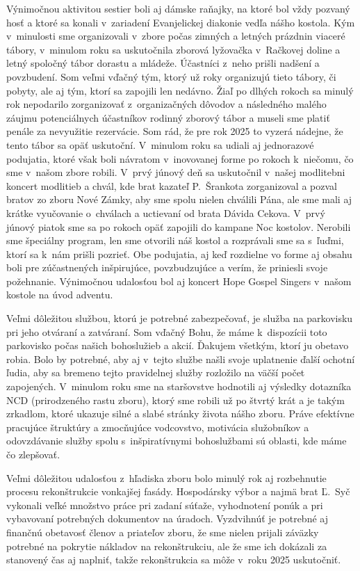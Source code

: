 Výnimočnou aktivitou sestier boli aj dámske raňajky, na ktoré bol vždy pozvaný hosť a ktoré sa konali v~zariadení Evanjelickej diakonie vedľa nášho kostola.
Kým v~minulosti sme organizovali v~zbore počas zimných a letných prázdnin viaceré tábory, v~minulom roku sa uskutočnila zborová lyžovačka v~Račkovej doline a letný spoločný tábor dorastu a mládeže. Účastníci z~neho prišli nadšení a povzbudení. Som veľmi vďačný tým, ktorý už roky organizujú tieto tábory, či pobyty, ale aj tým, ktorí sa zapojili len nedávno. Žiaľ po dlhých rokoch sa minulý rok nepodarilo zorganizovať z~organizačných dôvodov a následného malého záujmu potenciálnych účastníkov rodinný zborový tábor a museli sme platiť penále za nevyužitie rezervácie. Som rád, že pre rok 2025 to vyzerá nádejne, že tento tábor sa opäť uskutoční.
V~minulom roku sa udiali aj jednorazové podujatia, ktoré však boli návratom v~inovovanej forme po rokoch k~niečomu, čo sme v~našom zbore robili.
V~prvý júnový deň sa uskutočnil v~našej modlitebni koncert modlitieb a chvál, kde brat kazateľ P.~Šrankota zorganizoval a pozval bratov zo zboru Nové Zámky, aby sme spolu nielen chválili Pána, ale sme mali aj krátke vyučovanie o~chválach a uctievaní od brata Dávida Cekova. V~prvý júnový piatok sme sa po rokoch opäť zapojili do kampane Noc kostolov. Nerobili sme špeciálny program, len sme otvorili náš kostol a rozprávali sme sa s~ľuďmi, ktorí sa k~nám prišli pozrieť. Obe podujatia, aj keď rozdielne vo forme aj obsahu boli pre zúčastnených inšpirujúce, povzbudzujúce a verím, že priniesli svoje požehnanie. Výnimočnou udalosťou bol aj koncert Hope Gospel Singers v~našom kostole na úvod adventu.

Veľmi dôležitou službou, ktorú je potrebné zabezpečovať, je služba na parkovisku pri jeho otváraní a zatváraní. Som vďačný Bohu, že máme k~dispozícii toto parkovisko počas našich bohoslužieb a akcií. Ďakujem všetkým, ktorí ju obetavo robia. Bolo by potrebné, aby aj v~tejto službe našli svoje uplatnenie ďalší ochotní ľudia, aby sa bremeno tejto pravidelnej služby rozložilo na väčší počet zapojených.
V~minulom roku sme na staršovstve hodnotili aj výsledky dotazníka NCD (prirodzeného rastu zboru), ktorý sme robili už po štvrtý krát a je takým zrkadlom, ktoré ukazuje silné a slabé stránky života nášho zboru. Práve efektívne pracujúce štruktúry a zmocňujúce vodcovstvo, motivácia služobníkov a odovzdávanie služby spolu s~inšpiratívnymi bohoslužbami sú oblasti, kde máme čo zlepšovať.

Veľmi dôležitou udalosťou z~hľadiska zboru bolo minulý rok aj rozbehnutie procesu rekonštrukcie vonkajšej fasády. Hospodársky výbor a najmä brat Ľ.~Syč vykonali veľké množstvo práce pri zadaní súťaže, vyhodnotení ponúk a pri vybavovaní potrebných dokumentov na úradoch. Vyzdvihnúť je potrebné aj finančnú obetavosť členov a priateľov zboru, že sme nielen prijali záväzky potrebné na pokrytie nákladov na rekonštrukciu, ale že sme ich dokázali za stanovený čas aj naplniť, takže rekonštrukcia sa môže v~roku 2025 uskutočniť.

